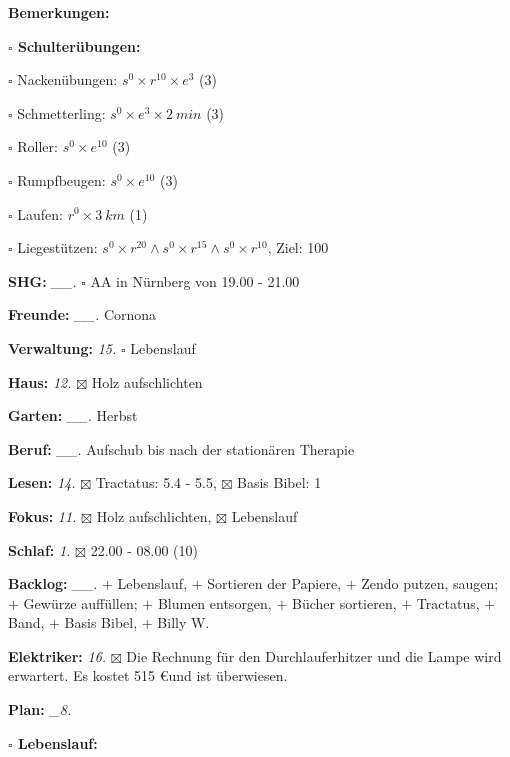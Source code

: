 \documentclass[10pt,a4paper]{article}
\newcommand\prop[1] {{\color {alizarin} {\bf #1}}}        %
\newcommand\opti[1] {{\color {amethyst} {\bf #1}}}        %
\newcommand\mand[1] {{\color {burntorange} {\bf #1}}}     %
\newcommand\topspace{\vskip -15pt \hskip 20pt}
\newcommand\bottomspace{\vskip 4pt}
\newcommand\n[1] { {\sl #1.} \hskip 5pt }
\begin{document}
\begin{mdframed}[style=daystyle]
\begin{labeling}{{\mand {Bemerkungen:}}}
\begin{minipage}{0.75\textwidth}
\begin{labeling}{\prop {$\square$ {Schulterübungen:}}}
      \item[$\square$ Nackenübungen:]   $s^0 \times r^{10} \times e^3$ (3)
      \item[$\square$ Schmetterling:]   $s^0 \times e^3 \times 2\ min$ (3)
      \item[$\square$ Roller:]          $s^0 \times e^{10}$ (3)
      \item[$\square$ Rumpfbeugen:]     $s^0 \times e^{10}$ (3)
      \item[$\square$ Laufen:]          $r^0 \times 3\ km$ (1)
      \item[$\square$ Liegestützen:]    $s^0 \times r^{20} \land s^0 \times r^{15} \land s^0 \times r^{10}$, Ziel: 100
      \end{labeling}
    \end{minipage}
    \bottomspace        
  \item[{\mand {SHG:}}]          \n{\_\_} $\square$ AA in Nürnberg von 19.00 - 21.00
  \item[{\mand {Freunde:}}]      \n{\_\_} Cornona
  \item[{\mand {Verwaltung:}}]     \n{15} $\square$ Lebenslauf
  \item[{\mand {Haus:}}]           \n{12} $\boxtimes$ Holz aufschlichten
  \item[{\mand {Garten:}}]       \n{\_\_} Herbst
  \item[{\mand {Beruf:}}]        \n{\_\_} Aufschub bis nach der stationären Therapie
  \item[{\mand {Lesen:}}]          \n{14} $\boxtimes$ Tractatus: 5.4 - 5.5, $\boxtimes$ Basis Bibel: 1
  \item[{\mand {Fokus:}}]          \n{11} $\boxtimes$ Holz aufschlichten, $\boxtimes$ Lebenslauf
  \item[{\mand {Schlaf:}}]          \n{1} $\boxtimes$ 22.00 - 08.00 (10)
  \item[{\mand {Backlog:}}]      \n{\_\_} 
      $+$ Lebenslauf, $+$ Sortieren der Papiere,
      $+$ Zendo putzen, saugen; $+$ Gewürze auffüllen; $+$ Blumen entsorgen, $+$ Bücher sortieren,
      $+$ Tractatus, $+$ Band, $+$ Basis Bibel, $+$ Billy W.
  \item[{\opti {Elektriker:}}]     \n{16} $\boxtimes$ Die Rechnung für den Durchlauferhitzer und die Lampe wird erwartert. 
    Es kostet 515 \euro und ist überwiesen.
  \item[{\mand {Plan:}}]          \n{\_8}
    \topspace
    \begin{minipage}{0.75\textwidth}  
      \begin{labeling}{\prop {$\square$ {Lebenslauf:}}} 

\end{labeling}
\end{minipage}
\end{labeling}
\end{mdframed}
\end{document}
